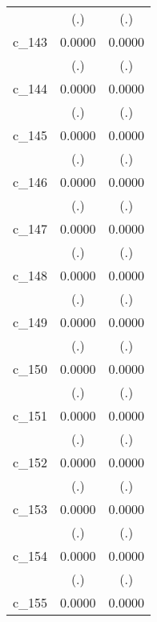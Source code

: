 {\begin{tabular}{l*{2}{c}}
            &         (.)        &         (.)        \\
[1em]
c\_143       &      0.0000        &      0.0000        \\
            &         (.)        &         (.)        \\
[1em]
c\_144       &      0.0000        &      0.0000        \\
            &         (.)        &         (.)        \\
[1em]
c\_145       &      0.0000        &      0.0000        \\
            &         (.)        &         (.)        \\
[1em]
c\_146       &      0.0000        &      0.0000        \\
            &         (.)        &         (.)        \\
[1em]
c\_147       &      0.0000        &      0.0000        \\
            &         (.)        &         (.)        \\
[1em]
c\_148       &      0.0000        &      0.0000        \\
            &         (.)        &         (.)        \\
[1em]
c\_149       &      0.0000        &      0.0000        \\
            &         (.)        &         (.)        \\
[1em]
c\_150       &      0.0000        &      0.0000        \\
            &         (.)        &         (.)        \\
[1em]
c\_151       &      0.0000        &      0.0000        \\
            &         (.)        &         (.)        \\
[1em]
c\_152       &      0.0000        &      0.0000        \\
            &         (.)        &         (.)        \\
[1em]
c\_153       &      0.0000        &      0.0000        \\
            &         (.)        &         (.)        \\
[1em]
c\_154       &      0.0000        &      0.0000        \\
            &         (.)        &         (.)        \\
[1em]
c\_155       &      0.0000        &      0.0000        \\

\end{tabular}}
